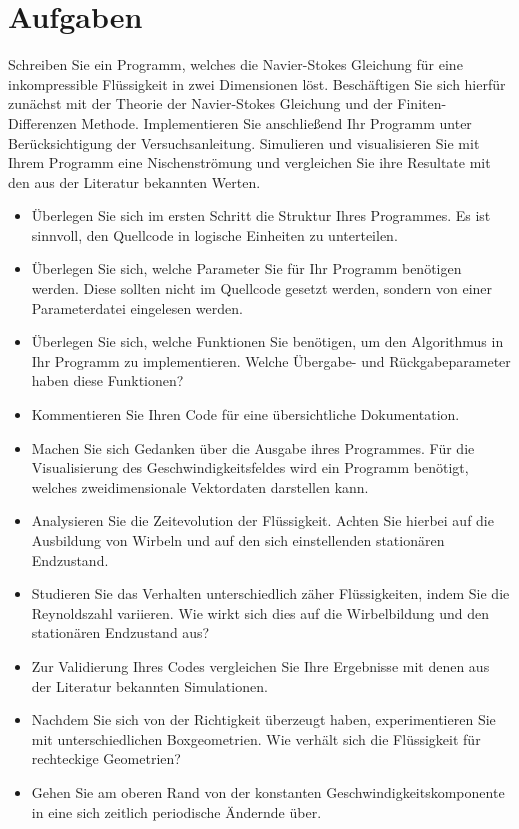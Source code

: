 \section{Aufgaben} %
\label{sec:aufgaben}

	Schreiben Sie ein Programm, welches die Navier-Stokes Gleichung für eine inkompressible Flüssigkeit in zwei Dimensionen löst.
	Beschäftigen Sie sich hierfür zunächst mit der Theorie der Navier-Stokes Gleichung und der Finiten-Differenzen Methode. 
	Implementieren Sie anschließend Ihr Programm unter Berücksichtigung der Versuchsanleitung.
	Simulieren und visualisieren Sie mit Ihrem Programm eine Nischenströmung und vergleichen Sie ihre Resultate mit den aus der Literatur bekannten Werten.
	

	\begin{itemize}
		\item Überlegen Sie sich im ersten Schritt die Struktur Ihres Programmes. 
		Es ist sinnvoll, den Quellcode in logische Einheiten zu unterteilen. 

		\item Überlegen Sie sich, welche Parameter Sie für Ihr Programm benötigen werden.
		Diese sollten nicht im Quellcode gesetzt werden, sondern von einer Parameterdatei eingelesen werden.

		\item Überlegen Sie sich, welche Funktionen Sie benötigen, um den Algorithmus in Ihr Programm zu implementieren.
		Welche Übergabe- und Rückgabeparameter haben diese Funktionen? 

		\item Kommentieren Sie Ihren Code für eine übersichtliche Dokumentation.

		\item Machen Sie sich Gedanken über die Ausgabe ihres Programmes.
		Für die Visualisierung des Geschwindigkeitsfeldes wird ein Programm benötigt, welches zweidimensionale Vektordaten darstellen kann.

		\item Analysieren Sie die Zeitevolution der Flüssigkeit.
		Achten Sie hierbei auf die Ausbildung von Wirbeln und auf den sich einstellenden stationären Endzustand.

		\item Studieren Sie das Verhalten unterschiedlich zäher Flüssigkeiten, indem Sie die Reynoldszahl variieren.
		Wie wirkt sich dies auf die Wirbelbildung und den stationären Endzustand aus?

		\item Zur Validierung Ihres Codes vergleichen Sie Ihre Ergebnisse mit denen aus der Literatur bekannten Simulationen.

		\item Nachdem Sie sich von der Richtigkeit überzeugt haben, experimentieren Sie mit	unterschiedlichen Boxgeometrien.
		Wie verhält sich die Flüssigkeit für rechteckige Geometrien?

		\item Gehen Sie am oberen Rand von der konstanten Geschwindigkeitskomponente in eine sich zeitlich periodische Ändernde über.

	\end{itemize}

